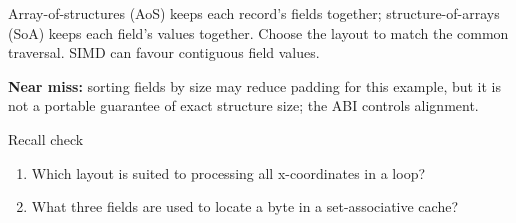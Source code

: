 \documentclass[11pt]{article}
\begin{document}
\begin{keepsection}
\begin{keepsection}
Array-of-structures (AoS) keeps each record’s fields together; structure-of-arrays (SoA) keeps each field’s values together. Choose the layout to match the common traversal. SIMD can favour contiguous field values.

\begin{notebox}\textbf{Near miss:} sorting fields by size may reduce padding for this example, but it is not a portable guarantee of exact structure size; the ABI controls alignment.\end{notebox}

\begin{recallbox}{Recall check}
\begin{enumerate}
\item Which layout is suited to processing all x-coordinates in a loop?
\item What three fields are used to locate a byte in a set-associative cache?
\end{enumerate}

\end{recallbox}
\end{keepsection}
\end{keepsection}
\end{document}
